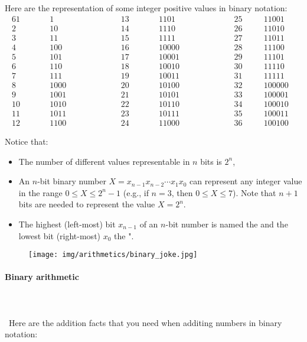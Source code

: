 	Here are the representation of some integer positive values in binary notation:
	\begin{alignat*}{6}
	1&\qquad&1& \qquad\quad\qquad&  13&\qquad&1101&\qquad\quad\qquad &25&\quad&11001&\\
	2&&10&&  14&&1110&&   26&&11010&\\
	3&&11&&  15&&1111&&   27&&11011&\\
	4&&100&& 16&&10000&&   28&&11100&\\
	5&&101&& 17&&10001&&   29&&11101&\\
	6&&110&& 18&&10010&&   30&&11110&\\
	7&&111&& 19&&10011&&   31&&11111&\\
	8&&1000&&20&&10100&&  32&&100000&\\
	9&&1001&&21&&10101&&  33&&100001&\\
	10&&1010&&22&&10110&& 34&&100010&\\
	11&&1011&&23&&10111&& 35&&100011&\\
	12&&1100&&24&&11000&& 36&&100100&
	\end{alignat*}

	Notice that:
	\begin{itemize}
		\item The  number of different values representable in $n$ bits is  $2^n$,
		
		\item An $n$-bit binary number $X=x_{n-1}x_{n-2}\cdots x_1 x_0$ can represent  any integer value in the range $0 \le X \le 2^n-1$ (e.g., if $n=3$,  then $0 \le X \le 7$). Note that $n+1$ bits are needed to represent the value $X=2^n$.
		
		\item The highest (left-most) bit $x_{n-1}$ of an $n$-bit number is named the  and the lowest bit (right-most) $x_0$ the ".
	\end{itemize}
	\begin{figure}[H]
		\centering
		\texttt{[image: img/arithmetics/binary\_joke.jpg]}
	\end{figure}
	
	\paragraph{Binary arithmetic}\mbox{}\\\\\
	Here are the addition facts that you need when additing numbers in binary notation:
	
